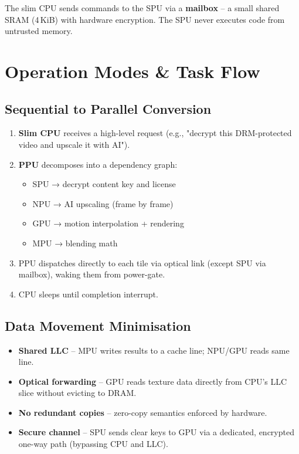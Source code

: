 \documentclass[10pt,twocolumn]{article}
\begin{document}
The slim CPU sends commands to the SPU via a \textbf{mailbox} – a small shared SRAM (4 KiB) with hardware encryption. The SPU never executes code from untrusted memory.

\section{Operation Modes \& Task Flow}

\subsection{Sequential to Parallel Conversion}
\begin{enumerate}
\item \textbf{Slim CPU} receives a high-level request (e.g., "decrypt this DRM-protected video and upscale it with AI").
\item \textbf{PPU} decomposes into a dependency graph:
      \begin{itemize}
      \item SPU → decrypt content key and license
      \item NPU → AI upscaling (frame by frame)
      \item GPU → motion interpolation + rendering
      \item MPU → blending math
      \end{itemize}
\item PPU dispatches directly to each tile via optical link (except SPU via mailbox), waking them from power-gate.
\item CPU sleeps until completion interrupt.
\end{enumerate}

\subsection{Data Movement Minimisation}
\begin{itemize}
\item \textbf{Shared LLC} – MPU writes results to a cache line; NPU/GPU reads same line.
\item \textbf{Optical forwarding} – GPU reads texture data directly from CPU's LLC slice without evicting to DRAM.
\item \textbf{No redundant copies} – zero-copy semantics enforced by hardware.
\item \textbf{Secure channel} – SPU sends clear keys to GPU via a dedicated, encrypted one-way path (bypassing CPU and LLC).
\end{itemize}
\end{document}

